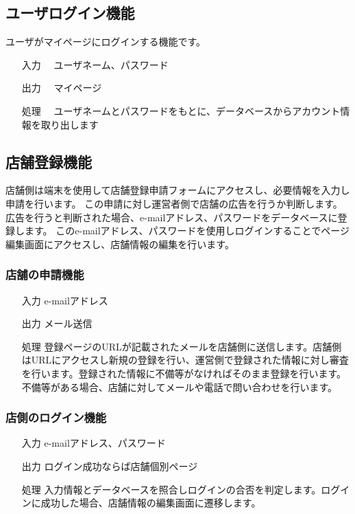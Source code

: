 \documentclass[a4j,titlepage]{jarticle}
\begin{document}
\subsection{ユーザログイン機能}
ユーザがマイページにログインする機能です。

\begin{enumerate}
  \item [入力]　ユーザネーム、パスワード
  \item [出力]　マイページ
  \item [処理]　ユーザネームとパスワードをもとに、データベースからアカウント情報を取り出します
\end{enumerate}
\subsection{店舗登録機能}
店舗側は端末を使用して店舗登録申請フォームにアクセスし、必要情報を入力し申請を行います。
この申請に対し運営者側で店舗の広告を行うか判断します。
広告を行うと判断された場合、e-mailアドレス、パスワードをデータベースに登録します。
このe-mailアドレス、パスワードを使用しログインすることでページ編集画面にアクセスし、店舗情報の編集を行います。

\subsubsection{店舗の申請機能}
\begin{enumerate}
\item[入力] e-mailアドレス
\item[出力] メール送信
\item[処理] 登録ページのURLが記載されたメールを店舗側に送信します。店舗側はURLにアクセスし新規の登録を行い、運営側で登録された情報に対し審査を行います。登録された情報に不備等がなければそのまま登録を行います。不備等がある場合、店舗に対してメールや電話で問い合わせを行います。
\end{enumerate}

\subsubsection{店側のログイン機能}
\begin{enumerate}
\item[入力] e-mailアドレス、パスワード
\item[出力] ログイン成功ならば店舗個別ページ
\item[処理] 入力情報とデータベースを照合しログインの合否を判定します。ログインに成功した場合、店舗情報の編集画面に遷移します。
\end{enumerate}
\end{document}
